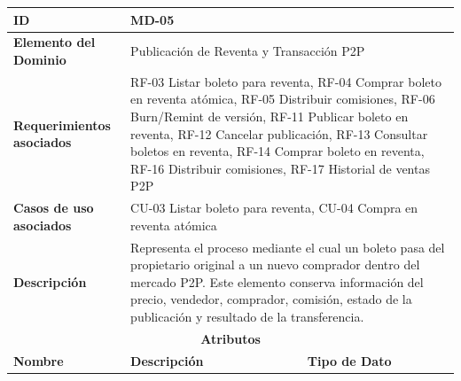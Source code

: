 \documentclass[12pt,letterpaper]{article}
\begin{document}
\begin{table}[H]
\centering
\scriptsize
\renewcommand{\arraystretch}{1.12}
\setlength{\tabcolsep}{4pt}

\begin{tabularx}{\textwidth}{|p{3.2cm}|X|p{3.8cm}|}
\hline
\textbf{ID} & MD-05 & \\ \hline

\textbf{Elemento del Dominio} & 
\multicolumn{2}{X|}{Publicación de Reventa y Transacción P2P} \\ \hline

\textbf{Requerimientos asociados} & 
\multicolumn{2}{X|}{RF-03 Listar boleto para reventa, RF-04 Comprar boleto en reventa atómica, RF-05 Distribuir comisiones, RF-06 Burn/Remint de versión, RF-11 Publicar boleto en reventa, RF-12 Cancelar publicación, RF-13 Consultar boletos en reventa, RF-14 Comprar boleto en reventa, RF-16 Distribuir comisiones, RF-17 Historial de ventas P2P} \\ \hline

\textbf{Casos de uso asociados} & 
\multicolumn{2}{X|}{CU-03 Listar boleto para reventa, CU-04 Compra en reventa atómica} \\ \hline

\textbf{Descripción} & 
\multicolumn{2}{X|}{Representa el proceso mediante el cual un boleto pasa del propietario original a un nuevo comprador dentro del mercado P2P. Este elemento conserva información del precio, vendedor, comprador, comisión, estado de la publicación y resultado de la transferencia.} \\ \hline

\multicolumn{3}{|c|}{\textbf{Atributos}} \\ \hline

\textbf{Nombre} & \textbf{Descripción} & \textbf{Tipo de Dato} \\ \hline


\end{tabularx}
\end{table}
\end{document}
